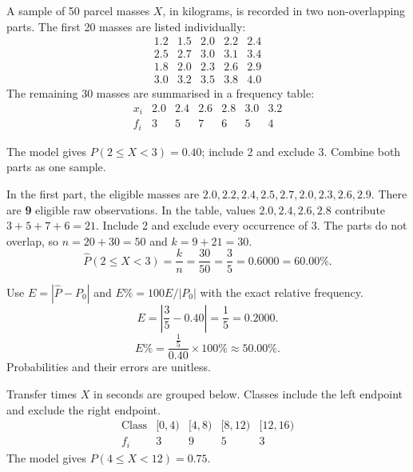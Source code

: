 A sample of 50 parcel masses $X$, in kilograms, is recorded in two non-overlapping parts. The first 20 masses are listed individually:
\[
\begin{array}{rrrrr}
1.2&1.5&2.0&2.2&2.4\\
2.5&2.7&3.0&3.1&3.4\\
1.8&2.0&2.3&2.6&2.9\\
3.0&3.2&3.5&3.8&4.0
\end{array}
\]
The remaining 30 masses are summarised in a frequency table:
\[
\begin{array}{c|rrrrrr}
x_i&2.0&2.4&2.6&2.8&3.0&3.2\\\hline
f_i&3&5&7&6&5&4
\end{array}
\]

 

The model gives $P(2\le X<3)=0.40$; include 2 and exclude 3. Combine both parts as one sample.


In the first part, the eligible masses are
$2.0,2.2,2.4,2.5,2.7,2.0,2.3,2.6,2.9$.
There are \textbf{9} eligible raw observations. In the table, values $2.0,2.4,2.6,2.8$ contribute $3+5+7+6=21$.
Include 2 and exclude every occurrence of 3. The parts do not overlap, so $n=20+30=50$ and $k=9+21=30$.
\[\widehat P(2\le X<3)=\frac kn=\frac{30}{50}=\frac{3}{5}=0.6000=60.00\%.\]

Use $E=|\widehat P-P_0|$ and $E\%=100E/|P_0|$ with the exact relative frequency.
\[E=\left|\frac{3}{5}-0.40\right|=\frac{1}{5}=0.2000.\]
\[E\%=\frac{\frac{1}{5}}{0.40}\times100\%\approx50.00\%.\]
Probabilities and their errors are unitless.

Transfer times $X$ in seconds are grouped below. Classes include the left endpoint and exclude the right endpoint.
\[
\begin{array}{c|rrrr}
\text{Class}&[0,4)&[4,8)&[8,12)&[12,16)\\\hline
f_i&3&9&5&3
\end{array}
\]
The model gives $P(4\le X<12)=0.75$.

